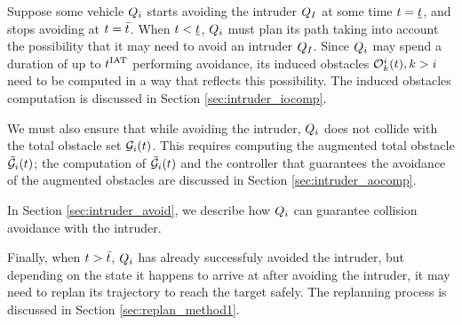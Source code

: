 Suppose some vehicle $Q_i$ starts avoiding the intruder $Q_{I}$ at some time $t = \underline{t}$, and stops avoiding at $t = \bar{t}$. When $t < \underline{t}$, $Q_i$ must plan its path taking into account the possibility that it may need to avoid an intruder $Q_I$. Since $Q_i$ may spend a duration of up to $t^\text{IAT}$ performing avoidance, its induced obstacles $\mathcal{O}_k^i(t), k>i$ need to be computed in a way that reflects this possibility. The induced obstacles computation is discussed in Section \ref{sec:intruder_iocomp}.

We must also ensure that while avoiding the intruder, $Q_i$ does not collide with the total obstacle set $\mathcal{G}_i(t)$. This requires computing the augmented total obstacle $\tilde{\mathcal{G}}_i(t)$; the computation of $\tilde{\mathcal{G}}_i(t)$ and the controller that guarantees the avoidance of the augmented obstacles are discussed in Section \ref{sec:intruder_aocomp}.

In Section \ref{sec:intruder_avoid}, we describe how $Q_i$ can guarantee collision avoidance with the intruder.

Finally, when $t > \bar{t}$, $Q_i$ has already successfuly avoided the intruder, but depending on the state it happens to arrive at after avoiding the intruder, it may need to replan its trajectory to reach the target safely. The replanning process is discussed in Section \ref{sec:replan_method1}.

